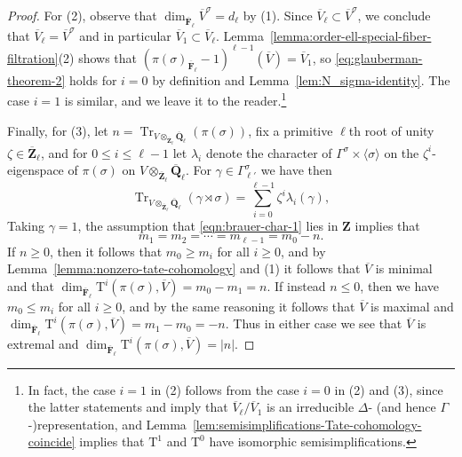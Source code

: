 \documentclass[reqno]{amsart}
\numberwithin{equation}{subsection}
\newcommand{\F}{\mathbf{F}}
\newcommand{\Q}{\mathbf{Q}}
\newcommand{\Z}{\mathbf{Z}}
\newcommand{\ol}[1]{\overline{#1}}
\DeclareMathOperator{\Tr}{Tr}
\newcommand{\rT}{\ensuremath{\mathrm{T}}\xspace}
\theoremstyle{remark}
\numberwithin{equation}{subsection}
\numberwithin{figure}{subsection}
\begin{document}
\begin{proof}
    For (2), observe that $\dim_{\ol\F_\ell} \ol V^\sigma = d_\ell$ by (1). Since $\ol V_\ell \subset \ol V^\sigma$, we conclude that $\ol V_\ell = \ol V^\sigma$ and in particular $\ol V_1 \subset \ol V_\ell$. Lemma~\ref{lemma:order-ell-special-fiber-filtration}(2) shows that $(\pi(\sigma)_{\ol\F_\ell} - 1)^{\ell-1}(\ol V) = \ol V_1$, so \eqref{eq:glauberman-theorem-2} holds for $i = 0$ by definition and Lemma~\ref{lem:N_sigma-identity}. The case $i = 1$ is similar, and we leave it to the reader.\footnote{In fact, the case $i = 1$ in (2) follows from the case $i = 0$ in (2) and (3), since the latter statements and \cite[Theorem 3]{Gla68} imply that $\ol V_\ell/\ol V_1$ is an irreducible $\Delta$- (and hence $\Gamma$-)representation, and Lemma~\ref{lem:semisimplifications-Tate-cohomology-coincide} implies that $\rT^1$ and $\rT^0$ have isomorphic semisimplifications.}
    
    Finally, for (3), let $n = \Tr_{V \otimes_{\ol\Z_\ell} \ol\Q_\ell}(\pi(\sigma))$, fix a primitive $\ell$th root of unity $\zeta \in \ol\Z_\ell$, and for $0 \leq i \leq \ell - 1$ let $\lambda_i$ denote the character of $\Gamma^\sigma \times \langle\sigma\rangle$ on the $\zeta^i$-eigenspace of $\pi(\sigma)$ on $V \otimes_{\ol\Z_\ell} \ol\Q_\ell$. For $\gamma \in \Gamma^\sigma_{\ell'}$ we have then
    \begin{equation}\label{eqn:brauer-char-1}
    \Tr_{V \otimes_{\ol\Z_\ell} \ol\Q_\ell}(\gamma \rtimes \sigma) = \sum_{i=0}^{\ell - 1} \zeta^i \lambda_i(\gamma),
    \end{equation}
    Taking $\gamma = 1$, the assumption that \eqref{eqn:brauer-char-1} lies in $\Z$ implies that 
    \begin{equation}\label{eq:dimension-equalities}
    m_1 = m_2 = \cdots = m_{\ell-1} = m_0 - n.
    \end{equation}
    If $n \geq 0$, then it follows that $m_0 \geq m_i$ for all $i \geq 0$, and by Lemma~\ref{lemma:nonzero-tate-cohomology} and (1) it follows that $\ol V$ is minimal and that $\dim_{\ol\F_\ell} \rT^i(\pi(\sigma), \ol V) = m_0 - m_1 = n$. If instead $n \leq 0$, then we have $m_0 \leq m_i$ for all $i \geq 0$, and by the same reasoning it follows that $\ol V$ is maximal and $\dim_{\ol\F_\ell} \rT^i(\pi(\sigma), \ol V) = m_1 - m_0 = -n$. Thus in either case we see that $\ol V$ is extremal and $\dim_{\ol\F_\ell} \rT^i(\pi(\sigma), \ol V) = |n|$.


\end{proof}
\end{document}
